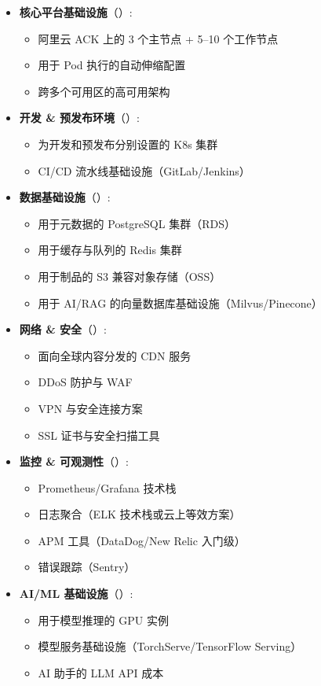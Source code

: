 \documentclass[11pt, a4paper, oneside]{article}
\begin{document}
\begin{itemize}
    \item \textbf{核心平台基础设施}（）:
    \begin{itemize}
        \item 阿里云 ACK 上的 3 个主节点 + 5--10 个工作节点
        \item 用于 Pod 执行的自动伸缩配置
        \item 跨多个可用区的高可用架构
    \end{itemize}
    
    \item \textbf{开发 \& 预发布环境}（）:
    \begin{itemize}
        \item 为开发和预发布分别设置的 K8s 集群
        \item CI/CD 流水线基础设施（GitLab/Jenkins）
    \end{itemize}
    
    \item \textbf{数据基础设施}（）:
    \begin{itemize}
        \item 用于元数据的 PostgreSQL 集群（RDS）
        \item 用于缓存与队列的 Redis 集群
        \item 用于制品的 S3 兼容对象存储（OSS）
        \item 用于 AI/RAG 的向量数据库基础设施（Milvus/Pinecone）
    \end{itemize}
    
    \item \textbf{网络 \& 安全}（）:
    \begin{itemize}
        \item 面向全球内容分发的 CDN 服务
        \item DDoS 防护与 WAF
        \item VPN 与安全连接方案
        \item SSL 证书与安全扫描工具
    \end{itemize}
    
    \item \textbf{监控 \& 可观测性}（）:
    \begin{itemize}
        \item Prometheus/Grafana 技术栈
        \item 日志聚合（ELK 技术栈或云上等效方案）
        \item APM 工具（DataDog/New Relic 入门级）
        \item 错误跟踪（Sentry）
    \end{itemize}
    
    \item \textbf{AI/ML 基础设施}（）:
    \begin{itemize}
        \item 用于模型推理的 GPU 实例
        \item 模型服务基础设施（TorchServe/TensorFlow Serving）
        \item AI 助手的 LLM API 成本
    \end{itemize}
\end{itemize}
\end{document}
